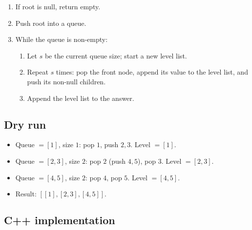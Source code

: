 \begin{enumerate}
  \item If root is null, return empty.
  \item Push root into a queue.
  \item While the queue is non-empty:
  \begin{enumerate}
    \item Let $s$ be the current queue size; start a new level list.
    \item Repeat $s$ times: pop the front node, append its value to the
          level list, and push its non-null children.
    \item Append the level list to the answer.
  \end{enumerate}
\end{enumerate}

\subsection*{Dry run}


\begin{itemize}
  \item Queue $=[1]$, size $1$: pop $1$, push $2,3$. Level $=[1]$.
  \item Queue $=[2,3]$, size $2$: pop $2$ (push $4,5$), pop $3$. Level
        $=[2,3]$.
  \item Queue $=[4,5]$, size $2$: pop $4$, pop $5$. Level $=[4,5]$.
  \item Result: $[[1],[2,3],[4,5]]$.
\end{itemize}

\subsection*{C++ implementation}

